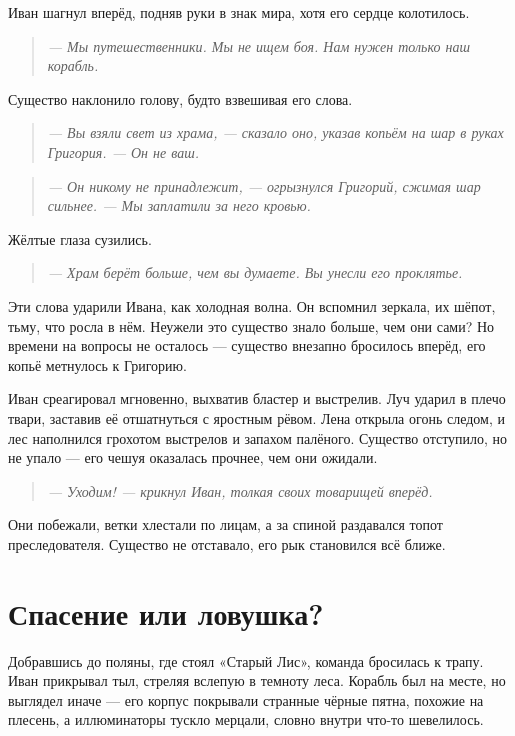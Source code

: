 \documentclass[12pt,a4paper]{book} %
\newenvironment{dialogue}{\begin{quote}\itshape}{\end{quote}}
\begin{document}
Иван шагнул вперёд, подняв руки в знак мира, хотя его сердце колотилось.

\begin{dialogue}
--- Мы путешественники. Мы не ищем боя. Нам нужен только наш корабль.
\end{dialogue}

Существо наклонило голову, будто взвешивая его слова.

\begin{dialogue}
--- Вы взяли свет из храма, --- сказало оно, указав копьём на шар в руках Григория. --- Он не ваш.
\end{dialogue}

\begin{dialogue}
--- Он никому не принадлежит, --- огрызнулся Григорий, сжимая шар сильнее. --- Мы заплатили за него кровью.
\end{dialogue}

Жёлтые глаза сузились.

\begin{dialogue}
--- Храм берёт больше, чем вы думаете. Вы унесли его проклятье.
\end{dialogue}

Эти слова ударили Ивана, как холодная волна. Он вспомнил зеркала, их шёпот, тьму, что росла в нём. Неужели это существо знало больше, чем они сами? Но времени на вопросы не осталось --- существо внезапно бросилось вперёд, его копьё метнулось к Григорию.

Иван среагировал мгновенно, выхватив бластер и выстрелив. Луч ударил в плечо твари, заставив её отшатнуться с яростным рёвом. Лена открыла огонь следом, и лес наполнился грохотом выстрелов и запахом палёного. Существо отступило, но не упало --- его чешуя оказалась прочнее, чем они ожидали.

\begin{dialogue}
--- Уходим! --- крикнул Иван, толкая своих товарищей вперёд.
\end{dialogue}

Они побежали, ветки хлестали по лицам, а за спиной раздавался топот преследователя. Существо не отставало, его рык становился всё ближе.

\section*{Спасение или ловушка?}

Добравшись до поляны, где стоял «Старый Лис», команда бросилась к трапу. Иван прикрывал тыл, стреляя вслепую в темноту леса. Корабль был на месте, но выглядел иначе --- его корпус покрывали странные чёрные пятна, похожие на плесень, а иллюминаторы тускло мерцали, словно внутри что-то шевелилось.
\end{document}
